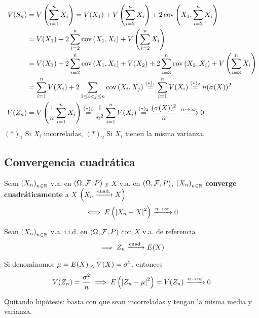 \[\begin{aligned}
		V(S_n) & = V\left(\sum_{i=1}^{n} X_i\right) = V(X_1) + V\left(\sum_{i=2}^{n} X_i\right) + 2 \operatorname{cov}\left(X_1, \sum_{i=2}^{n} X_i\right)                                                            \\
		       & = V(X_1) + 2 \sum_{i=2}^{n} \operatorname{cov}\left(X_1, X_i\right) + V\left(\sum_{i=2}^{n} X_i\right)                                                                                               \\
		       & = V(X_1) + 2 \sum_{i=2}^{n} \operatorname{cov}\left(X_1, X_i\right) + V(X_2) + 2 \sum_{i=3}^{n} \operatorname{cov}\left(X_2, X_i\right) + V\left(\sum_{i=3}^{n} X_i\right)                                                    \\
		       & = \sum_{i=1}^{n} V(X_i) + 2 \sum_{1\leq i < j \leq n} \operatorname{cov}\left(X_i,X_j\right) \stackrel{(*)_1}{=} \sum_{i=1}^{n} V(X_i) \stackrel{(*)_2}{=} n(\sigma(X))^2                            \\
		V(Z_n) & = V\left(\frac{1}{n}\sum_{i=1}^{n} X_i\right) \stackrel{(*)_1}{=} \frac{1}{n^2}\sum_{i=1}^{n} V(X_i) \stackrel{(*)_2}{=} \frac{(\sigma(X))^2}{n} \xrightarrow{n\to\infty} 0
	\end{aligned}\]
\hspace*{\fill} $(*)_1$ Si $X_i$ incorreladas, $(*)_2$ Si $X_i$ tienen la misma varianza.

\subsection{Convergencia cuadrática}

\begin{defn}
	Sean $\left(X_n\right)_{n\in \mathbb{N}}$ v.a. en $(\Omega, \mathcal{F}, P)$ y $X$ v.a. en $(\Omega, \mathcal{F}, P)$, $\left(X_n\right)_{n\in \mathbb{N}}$ \textbf{converge cuadráticamente} a $X$ $\left(X_n \xrightarrow{\text{cuad.}} X\right)$
	\[\iff E\left(\left|X_n - X\right|^2\right) \xrightarrow{n\to\infty} 0\]
\end{defn}

\begin{teo}
	Sean $\left(X_n\right)_{n\in \mathbb{N}}$ v.a. i.i.d. en $(\Omega, \mathcal{F}, P)$ con $X$ v.a. de referencia
	\[\implies Z_n\xrightarrow{\text{cuad.}} E(X)\]
	\begin{dem}
		Si denominamos $\mu = E(X) \; _{\wedge} \; V(X) = \sigma^2$, entonces
		\[V(Z_n)=\frac{\sigma^2}{n} \implies E\left(\left|Z_n - \mu\right|^2\right) = V(Z_n) \xrightarrow{n\to\infty} 0\]
	\end{dem}
	Quitando hipótesis: basta con que sean incorreladas y tengan la misma media y varianza.
\end{teo}

